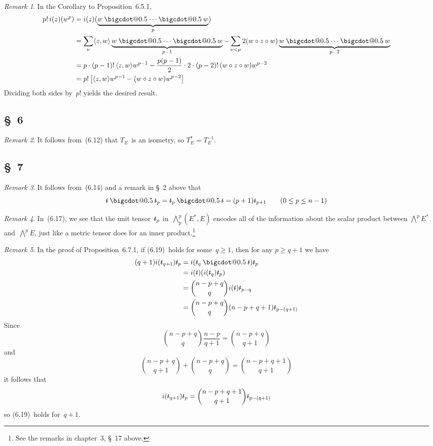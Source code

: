 \documentclass[letterpaper,12pt]{article}
\makeatletter
\newcommand{\bigcdot}[1]{\mathbin{\mathpalette\bigcdot@{#1}}}
\newcommand{\bigcdot@}[2]{%
  \sbox0{$#1\vcenter{}$}%
  \sbox2{$#1\cdot\m@th$}%
  \hbox{%
    \hfil
    \raise\ht0\hbox{%
      \scalebox{#2}{%
        \lower\ht0\hbox{$#1\bullet\m@th$}%
      }%
    }%
    \hfil
  }%
}
\newcommand{\after}{\circ}
\newcommand{\mult}{\cdot}
\newcommand{\bigeprod}{\bigwedge}
\newcommand{\medeprod}{{\textstyle\bigeprod}}
\newcommand{\mprod}{\bigcdot{0.5}}
\newcommand{\sprod}[2]{\langle#1,#2\rangle}
\newcommand{\multi}[4]{#2_{#3}#1\cdots#1#2_{#4}}
\newcommand{\mprods}[3]{\multi{\mprod}{#1}{#2}{#3}}
\newcommand{\stroked}[1]{\mathrlap{\text{\kern0.05em-}}#1}
\newcommand{\unit}{\stroked{t}}
\theoremstyle{definition}
\theoremstyle{remark}
\newtheorem*{rmk}{Remark}
\makeatother
\begin{document}
\begin{rmk}
In the Corollary to Proposition~6.5.1,
\begin{align*}
p!\,i(z)(w^p)&=i(z)(\underbrace{\mprods{w}{}{}}_p)\\
	&=\sum_{\nu}\sprod{z}{w}\underbrace{\mprods{w}{}{}}_{p-1}-\sum_{\nu<\mu}2(w\after z\after w)\underbrace{\mprods{w}{}{}}_{p-2}\\
	&=p\mult(p-1)!\,\sprod{z}{w}w^{p-1}-\frac{p(p-1)}{2}\mult 2\mult(p-2)!\,(w\after z\after w)w^{p-2}\\
	&=p!\,\bigl[\sprod{z}{w}w^{p-1}-(w\after z\after w)w^{p-2}\bigr]
\end{align*}
Dividing both sides by~\(p!\) yields the desired result.
\end{rmk}

\subsection*{\S~6}
\begin{rmk}
It follows from~(6.12) that \(T_E\)~is an isometry, so \(T_E^*=T_E^{-1}\).
\end{rmk}

\subsection*{\S~7}
\begin{rmk}
It follows from~(6.14) and a remark in \S~2 above that
\[\unit\mprod\unit_p=\unit_p\mprod\unit=(p+1)\unit_{p+1}\qquad(0\le p\le n-1)\]
\end{rmk}

\begin{rmk}
In~(6.17), we see that the unit tensor~\(\unit_p\) in~\(\medeprod^p_p(E^*,E)\) encodes all of the information about the scalar product between \(\medeprod^p E^*\) and~\(\medeprod^p E\), just like a metric tensor does for an inner product.\footnote{See the remarks in chapter~3, \S~17 above.}
\end{rmk}

\begin{rmk}
In the proof of Proposition~6.7.1, if (6.19)~holds for some~\(q\ge 1\), then for any \(p\ge q+1\) we have
\begin{align*}
(q+1)i(\unit_{q+1})\unit_p&=i(\unit_q\mprod\unit)\unit_p\\
	&=i(\unit)(i(\unit_q)\unit_p)\\
	&=\binom{n-p+q}{q}i(\unit)\unit_{p-q}\\
	&=\binom{n-p+q}{q}(n-p+q+1)\unit_{p-(q+1)}
\end{align*}
Since
\[\binom{n-p+q}{q}\frac{n-p}{q+1}=\binom{n-p+q}{q+1}\]
and
\[\binom{n-p+q}{q+1}+\binom{n-p+q}{q}=\binom{n-p+q+1}{q+1}\]
it follows that
\[i(\unit_{q+1})\unit_p=\binom{n-p+q+1}{q+1}\unit_{p-(q+1)}\]
so (6.19)~holds for~\(q+1\).
\end{rmk}
\end{document}
